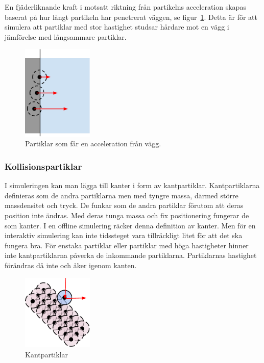 \documentclass[a4paper,12pt,oneside,final]{extarticle}
\begin{document}
En fjäderliknande kraft i motsatt riktning från partikelns acceleration skapas baserat på hur långt partikeln har penetrerat väggen, se figur~\ref{fig:vagg_kraft}.
Detta är för att simulera att partiklar med stor hastighet studsar hårdare mot en vägg i jämförelse med långsammare partiklar.
\begin{figure}[H] 
  \centering
    \includegraphics[width=0.3\textwidth]{bilder/partiklar_vagg}
  \caption{Partiklar som får en acceleration från vägg.} \label{fig:vagg_kraft}
\end{figure}

\subsubsection{Kollisionspartiklar}
I simuleringen kan man lägga till kanter i form av kantpartiklar.
Kantpartiklarna definieras som de andra partiklarna men med tyngre massa, därmed större massdensitet och tryck.
De funkar som de andra partiklar förutom att deras position inte ändras.
Med deras tunga massa och fix positionering fungerar de som kanter.
I en offline simulering räcker denna definition av kanter.
Men för en interaktiv simulering kan inte tidssteget vara tillräckligt litet för att det ska fungera bra.
För enstaka partiklar eller partiklar med höga hastigheter hinner inte kantpartiklarna påverka de inkommande partiklarna.
Partiklarnas hastighet förändras då inte och åker igenom kanten. 

\begin{figure}[H]
  \centering
    \includegraphics[width=0.3\textwidth]{bilder/partiklar_kolpart}
  \caption{Kantpartiklar}
\end{figure}
\end{document}
